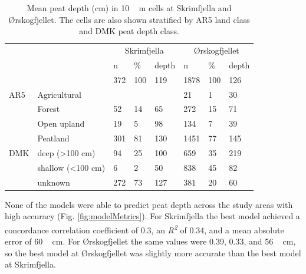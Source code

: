 \documentclass[soil, manuscript]{copernicus}
\begin{document}
\begin{table}[tbp]
\caption{Mean peat depth (cm) in \unit{10\,m} cells at Skrimfjella and Ørskogfjellet. The cells are also shown stratified by AR5 land class and DMK peat depth class.}
\begin{tabular}{llllllll}
\hline
    &                            & \multicolumn{3}{c}{Skrimfjella} & \multicolumn{3}{c}{Ørskogfjellet} \\ \cline{3-8} 
    &                            & n        & \%      & depth      & n          & \%      & depth      \\ \hline
    &                            & 372      & 100     & 119        & 1878       & 100     & 126        \\
AR5 & Agricultural               &          &         &            & 21         & 1       & 30         \\
    & Forest                     & 52       & 14      & 65         & 272        & 15      & 71         \\
    & Open upland                & 19       & 5       & 98         & 134        & 7       & 39         \\
    & Peatland                   & 301      & 81      & 130        & 1451       & 77      & 145        \\
DMK & deep (\textgreater 100 cm) & 94       & 25      & 100        & 659        & 35      & 219        \\
    & shallow (\textless 100 cm) & 6        & 2       & 50         & 838        & 45      & 82         \\
    & unknown                    & 272      & 73      & 127        & 381        & 20      & 60         \\ \hline
\end{tabular}
\label{tab:depthsByClass}
\end{table}

None of the models were able to predict peat depth across the study areas with high accuracy (Fig. \ref{fig:modelMetrics}).
For Skrimfjella the best model achieved a concordance correlation coefficient of 0.3, an \emph{R\textsuperscript{2}} of 0.34, and a mean absolute error of \unit{60\,cm}.
For Ørskogfjellet the same values were 0.39, 0.33, and \unit{56\,cm}, so the best model at Ørskogfjellet was slightly more accurate than the best model at Skrimfjella.
\end{document}
